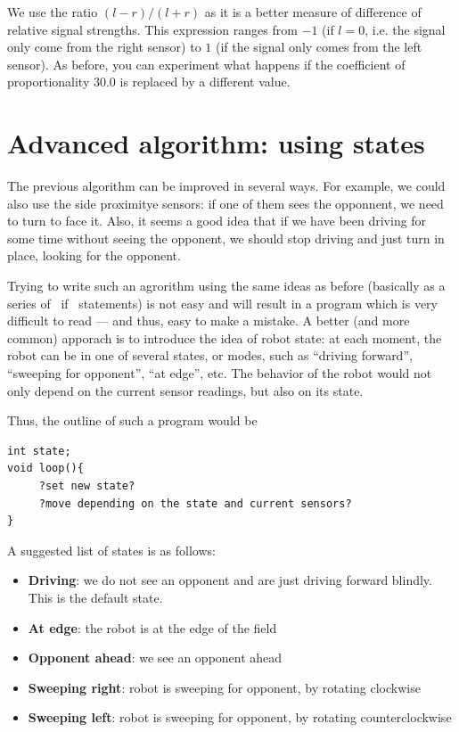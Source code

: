 \documentclass[oneside]{stml-l}
\numberwithin{figure}{chapter}
\begin{document}
We use the ratio $(l-r)/(l+r)$ as it is a better measure of difference
of relative signal strengths. This expression ranges from $-1$ (if $l=0$,
i.e. the signal only come from the right sensor) to $1$ (if the signal
only comes from the left sensor). As before, you can experiment what happens if
the coefficient of proportionality $30.0$ is replaced by a different value.


\section{Advanced algorithm: using states}
The previous algorithm can be improved in several ways. For example,
we could also use the side proximitye sensors: if one of them sees the
opponnent, we need to turn to face it. Also, it seems a good idea that
if we have been driving for some time without seeing the opponent,
we should stop driving and just turn in place, looking for the opponent.

Trying to write such an agrorithm using the same ideas as before (basically
as a series of ~if~ statements) is not easy and will result in a program
which is very difficult to read --- and thus, easy to make a mistake. A better
(and more common) apporach is to  introduce the idea of robot state:
at each moment, the robot can be in one of several states, or modes, such as
``driving forward'', ``sweeping for opponent'', ``at edge'', etc. The behavior
of the robot would not only depend on the current sensor readings, but also on
its state.

Thus, the outline of such a program would be
\begin{lstlisting}
int state;
void loop(){
     ?set new state?
     ?move depending on the state and current sensors?
}
\end{lstlisting}

A suggested list of states is as follows:
\begin{itemize}
\item {\bf Driving}: we do not see an opponent and are just driving forward blindly.
This is the default state.
\item {\bf At edge}: the robot is at the edge of the field
\item {\bf Opponent ahead}: we see an opponent ahead
\item {\bf Sweeping right}: robot is sweeping for opponent, by rotating clockwise
\item {\bf Sweeping left}: robot is sweeping for opponent, by rotating counterclockwise
\end{itemize}
\end{document}
